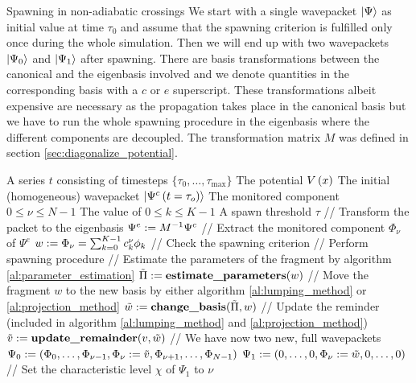 \begin{chapter}{Spawning in non-adiabatic crossings}
We start with a single wavepacket $\Ket{\Psi}$ as initial value at time $\tau_0$
and assume that the spawning criterion is fulfilled only once during the whole simulation.
Then we will end up with two wavepackets $\Ket{\Psi_0}$ and $\Ket{\Psi_1}$ after
spawning. There are basis transformations between the canonical and the eigenbasis
involved and we denote quantities in the corresponding basis with a $c$ or $e$
superscript. These transformations albeit expensive are necessary as the propagation
takes place in the canonical basis but we have to run the whole spawning procedure
in the eigenbasis where the different components are decoupled. The transformation
matrix $M$ was defined in section \ref{sec:diagonalize_potential}.

\begin{algorithm}
\caption{Spawning propagation method (simplified non-adiabatic case)}
\label{al:spawning_propagation_na_simplified}
\begin{algorithmic}
  \REQUIRE A series $t$ consisting of timesteps $\{\tau_0, \ldots, \tau_{\text{max}}\}$
  \REQUIRE The potential $V\left( x \right)$
  \REQUIRE The initial (homogeneous) wavepacket $\Ket{\Psi^c\left( t=\tau_o \right)}$
  \REQUIRE The monitored component $0 \leq \nu \leq N-1$
  \REQUIRE The value of $0 \leq k \leq K-1$
  \REQUIRE A spawn threshold $\tau$
    \STATE // Transform the packet to the eigenbasis
    \STATE $\Psi^e := M^{-1} \Psi^c$
    \STATE // Extract the monitored component $\Phi_\nu$ of $\Psi^e$
    \STATE $w := \Phi_\nu = \sum_{k=0}^{K-1} c^\nu_k \phi_k$
    \STATE // Check the spawning criterion
      \STATE // Perform spawning procedure
      \STATE // Estimate the parameters of the fragment by algorithm \ref{al:parameter_estimation}
      \STATE $\tilde{\Pi} := \textbf{estimate\_parameters}(w)$
      \STATE // Move the fragment $w$ to the new basis by either algorithm \ref{al:lumping_method} or \ref{al:projection_method}
      \STATE $\tilde{w} := \textbf{change\_basis}(\tilde{\Pi}, w)$
      \STATE // Update the reminder (included in algorithm \ref{al:lumping_method} and \ref{al:projection_method})
      \STATE $\tilde{v} := \textbf{update\_remainder}(v, \tilde{w})$
      \STATE // We have now two new, full wavepackets
      \STATE $\Psi_0 := \left(\Phi_0, \ldots, \Phi_{\nu-1}, \Phi_\nu:=\tilde{v}, \Phi_{\nu+1}, \ldots, \Phi_{N-1}\right)$
      \STATE $\Psi_1 := \left(0, \ldots, 0, \Phi_\nu:=\tilde{w}, 0, \ldots, 0\right)$
      \STATE // Set the characteristic level $\chi$ of $\Psi_1$ to $\nu$

\end{algorithmic}
\end{algorithm}
\end{chapter}
